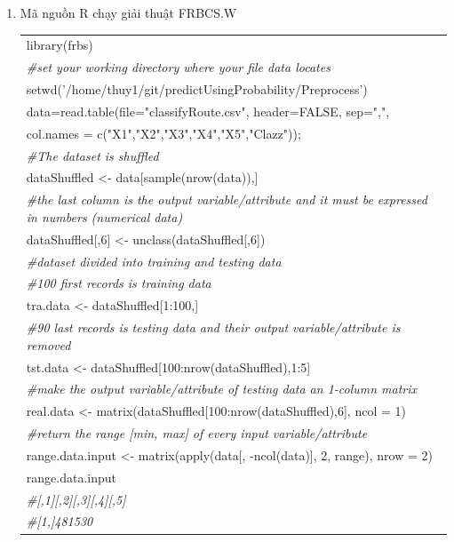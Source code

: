 \documentclass[a4paper, 13pt]{report}
\begin{document}
\begin{enumerate}[label=\textbf{PL\arabic*}]
\item Mã nguồn R chạy giải thuật FRBCS.W
\begin{flushleft}
\begin{tabular}{  |l| }
\hline 
library(frbs)\\
\textit{\#set your working directory where your file data locates}\\
setwd('/home/thuy1/git/predictUsingProbability/Preprocess')\\
data=read.table(file="classifyRoute.csv", header=FALSE, sep=",",\\
\hspace{1cm} col.names = c("X1","X2","X3","X4","X5","Clazz"));\\
\textit{\#The dataset is shuffled}\\
dataShuffled <- data[sample(nrow(data)),]\\
\textit{\#the last column is the output variable/attribute and it must be expressed in numbers (numerical data)}\\
dataShuffled[,6] <- unclass(dataShuffled[,6])\\
\textit{\#dataset divided into training and testing data}\\
\textit{\#100 first records is training data}\\
tra.data <- dataShuffled[1:100,]\\
\textit{\#90 last records is testing data and their output variable/attribute is removed}\\
tst.data <- dataShuffled[100:nrow(dataShuffled),1:5]\\
\textit{\#make the output variable/attribute of testing data an 1-column matrix}\\
real.data <- matrix(dataShuffled[100:nrow(dataShuffled),6], ncol = 1)\\
\textit{\#return the range [min, max] of every input variable/attribute}\\
range.data.input <- matrix(apply(data[, -ncol(data)], 2, range), nrow = 2)\\
range.data.input\\
\textit{\#\hspace{1cm}[,1]\hspace{0.5cm}[,2]\hspace{0.5cm}[,3]\hspace{0.5cm}[,4]\hspace{0.5cm}[,5]}\\
\textit{\#[1,]\hspace{0.5cm}4\hspace{0.8cm}8\hspace{0.8cm}15\hspace{0.8cm}3\hspace{0.8cm}0}\\

\end{tabular}
\end{flushleft}
\end{enumerate}
\end{document}
